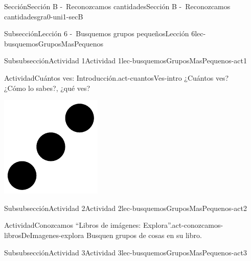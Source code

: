\documentclass[twoside,10pt,]{article}
\begin{document}
\begin{sectionptx}{Sección}{Sección B -~Reconozcamos cantidades}{}{Sección B -~Reconozcamos cantidades}{}{}{gra0-uni1-secB}
\begin{subsectionptx}{Subsección}{Lección 6 -~Busquemos grupos pequeños}{}{Lección 6}{}{}{lec-busquemosGruposMasPequenos}
\begin{subsubsectionptx}{Subsubsección}{Actividad 1}{}{Actividad 1}{}{}{lec-busquemosGruposMasPequenos-act1}
\begin{activity}{Actividad}{Cuántos ves: Introducción.}{act-cuantosVes-intro}%
¿Cuántos ves?\\
 ¿Cómo lo sabes?, ¿qué ves?%
\begin{image}{0}{1}{0}{}%
\includegraphics[width=\linewidth]{external/svg-source/tikz-file-148150.pdf}
\end{image}%
\end{activity}%
\end{subsubsectionptx}
%
%
\typeout{************************************************}
\typeout{************************************************}
%
\begin{subsubsectionptx}{Subsubsección}{Actividad 2}{}{Actividad 2}{}{}{lec-busquemosGruposMasPequenos-act2}
\begin{activity}{Actividad}{Conozcamos “Libros de imágenes: Explora”.}{act-conozcamos-librosDeImagenes-explora}%
Busquen grupos de cosas en su libro.%
\end{activity}%
\end{subsubsectionptx}
%
%
\typeout{************************************************}
\typeout{************************************************}
%
\begin{subsubsectionptx}{Subsubsección}{Actividad 3}{}{Actividad 3}{}{}{lec-busquemosGruposMasPequenos-act3}

\end{subsubsectionptx}
\end{subsectionptx}
\end{sectionptx}
\end{document}
